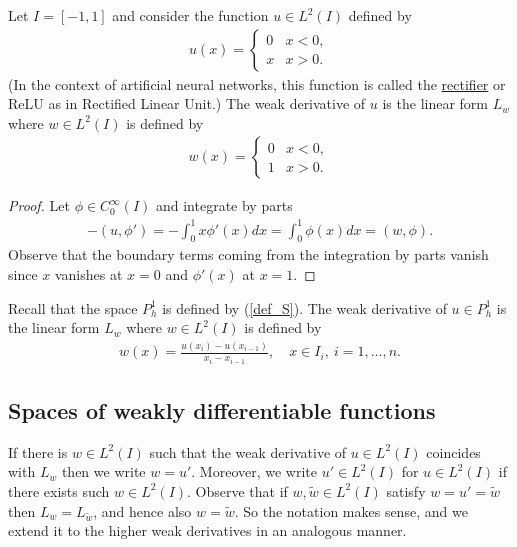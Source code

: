 \documentclass[12pt,oneside,final]{amsart}
\begin{document}
\begin{example}\label{ex_relu}
Let $I = [-1,1]$ and consider the function $u \in L^2(I)$ defined by
    \begin{align*}
u(x) = \begin{cases}
0 & x < 0,
\\
x & x > 0.
\end{cases}
    \end{align*}
(In the context of artificial neural networks, this function is called the \href{https://en.wikipedia.org/wiki/Rectifier_(neural_networks)}{rectifier} or ReLU as in Rectified Linear Unit.)
The weak derivative of $u$ is the linear form $L_w$ where
$w \in L^2(I)$ is defined by 
    \begin{align*}
w(x) = \begin{cases}
0 & x < 0,
\\
1 & x > 0.
\end{cases}
    \end{align*}
\end{example}
\begin{proof}
Let $\phi \in C_0^\infty(I)$ and integrate by parts
    \begin{align*}
-(u, \phi') = -\int_0^1 x \phi'(x) dx = \int_0^1 \phi(x) dx
= (w, \phi).
    \end{align*}
Observe that the boundary terms coming from the integration by parts vanish since $x$ vanishes at $x = 0$ and $\phi'(x)$ at $x = 1$. 
\end{proof}

\begin{example}\label{ex_deriv_P1h}
Recall that the space $P^1_h$ is defined by (\ref{def_S}).
The weak derivative of $u \in P^1_h$ is the linear form $L_w$ where
$w \in L^2(I)$ is defined by 
    \begin{align*}
w(x) = \frac{u(x_i) - u(x_{i-1})}{x_i - x_{i-1}}, \quad x \in I_i,\ i=1,\dots,n.
    \end{align*}
\end{example}

\subsection{Spaces of weakly differentiable functions}

If there is $w \in L^2(I)$ such that the weak derivative of $u \in L^2(I)$ coincides with $L_w$ then we write $w = u'$.
Moreover, we write $u' \in L^2(I)$ for $u \in L^2(I)$ if there exists such $w \in L^2(I)$.
Observe that if $w, \tilde w \in L^2(I)$ satisfy $w = u' = \tilde w$ then $L_w = L_{\tilde w}$, and hence also $w = \tilde w$. 
So the notation makes sense, and we extend it to the higher weak derivatives in an analogous manner. 
\end{document}
